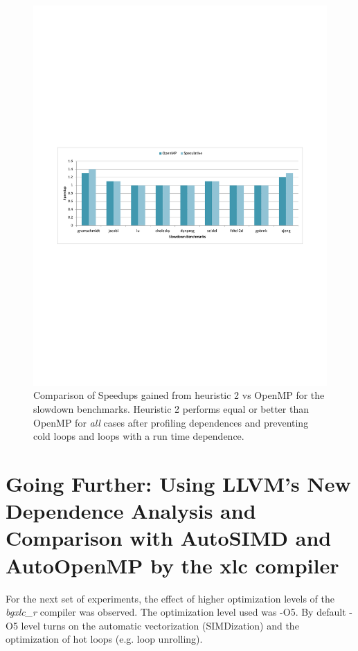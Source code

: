 \documentclass[10pt]{report}          %
\begin{document}
\begin{figure}
\centering
\includegraphics[scale=0.75]{./pdf/heu2.pdf}
\caption{Comparison of Speedups gained from heuristic 2 vs OpenMP for the slowdown benchmarks. Heuristic 2 performs equal or better than OpenMP for \textit{all} cases after profiling dependences and preventing cold loops and loops with a run time dependence. }
\label{fig:heu2}
\end{figure}

\section{Going Further: Using LLVM's New Dependence Analysis and Comparison with AutoSIMD and AutoOpenMP by the xlc compiler}

For the next set of experiments, the effect of higher optimization levels of the \textit{bgxlc\_r} compiler was observed.  The optimization level used was -O5.  By default -O5 level turns on the automatic vectorization (SIMDization) and the optimization of hot loops (e.g. loop unrolling).  \\
\end{document}
